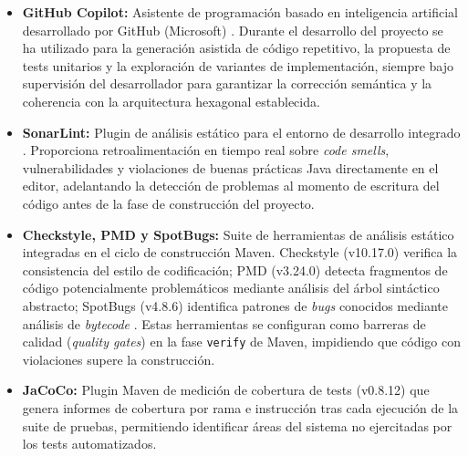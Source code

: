 \begin{itemize}
    \item \textbf{GitHub Copilot:} Asistente de programación basado en
    inteligencia artificial desarrollado por GitHub (Microsoft)
    \parencite{github_copilot_2024}. Durante el desarrollo del proyecto se ha
    utilizado para la generación asistida de código repetitivo, la propuesta
    de tests unitarios y la exploración de variantes de implementación, siempre
    bajo supervisión del desarrollador para garantizar la corrección semántica
    y la coherencia con la arquitectura hexagonal establecida.

    \item \textbf{SonarLint:} Plugin de análisis estático para el entorno de
    desarrollo integrado \parencite{sonarsource_sonarlint_2024}. Proporciona
    retroalimentación en tiempo real sobre \textit{code smells},
    vulnerabilidades y violaciones de buenas prácticas Java directamente en
    el editor, adelantando la detección de problemas al momento de escritura
    del código antes de la fase de construcción del proyecto.

    \item \textbf{Checkstyle, PMD y SpotBugs:} Suite de herramientas de
    análisis estático integradas en el ciclo de construcción Maven.
    Checkstyle (v10.17.0) verifica la consistencia del estilo de codificación;
    PMD (v3.24.0) detecta fragmentos de código potencialmente problemáticos
    mediante análisis del árbol sintáctico abstracto; SpotBugs (v4.8.6)
    identifica patrones de \textit{bugs} conocidos mediante análisis de
    \textit{bytecode} \parencite{owasp_password_2024}. Estas herramientas se
    configuran como barreras de calidad (\textit{quality gates}) en la fase
    \texttt{verify} de Maven, impidiendo que código con violaciones supere la
    construcción.

    \item \textbf{JaCoCo:} Plugin Maven de medición de cobertura de tests
    (v0.8.12) que genera informes de cobertura por rama e instrucción tras
    cada ejecución de la suite de pruebas, permitiendo identificar áreas del
    sistema no ejercitadas por los tests automatizados.

\end{itemize}